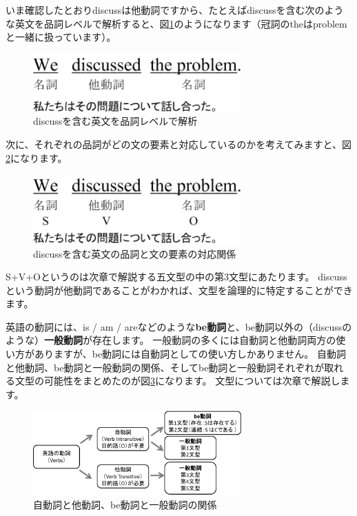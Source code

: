 \documentclass[12pt,titlepage]{jsarticle}
\begin{document}
いま確認したとおりdiscussは他動詞ですから、たとえばdiscussを含む次のような英文を品詞レベルで解析すると、図\ref{fig9}のようになります（冠詞のtheはproblemと一緒に扱っています）。
  \begin{figure}[htbp]
   \begin{center}
    \includegraphics[width=8cm]{./figure/fig9.pdf}
    \caption{discussを含む英文を品詞レベルで解析}
    \label{fig9}
   \end{center}
  \end{figure}

  次に、それぞれの品詞がどの文の要素と対応しているのかを考えてみますと、図\ref{fig10}になります。
  \begin{figure}[htbp]
   \begin{center}
    \includegraphics[width=8cm]{./figure/fig10.pdf}
    \caption{discussを含む英文の品詞と文の要素の対応関係}
    \label{fig10}
   \end{center}
  \end{figure}

  S+V+Oというのは次章で解説する五文型の中の第3文型にあたります。
  discussという動詞が他動詞であることがわかれば、文型を論理的に特定することができます。

  英語の動詞には、is / am / areなどのような{\bf be動詞}と、be動詞以外の（discussのような）{\bf 一般動詞}が存在します。
  一般動詞の多くには自動詞と他動詞両方の使い方がありますが、be動詞には自動詞としての使い方しかありません。
  自動詞と他動詞、be動詞と一般動詞の関係、そしてbe動詞と一般動詞それぞれが取れる文型の可能性をまとめたのが図\ref{fig11}になります。
  文型については次章で解説します。
  \begin{figure}[htbp]
   \begin{center}
    \includegraphics[width=8cm]{./figure/fig11.pdf}
    \caption{自動詞と他動詞、be動詞と一般動詞の関係}
    \label{fig11}
   \end{center}
  \end{figure}
\end{document}
